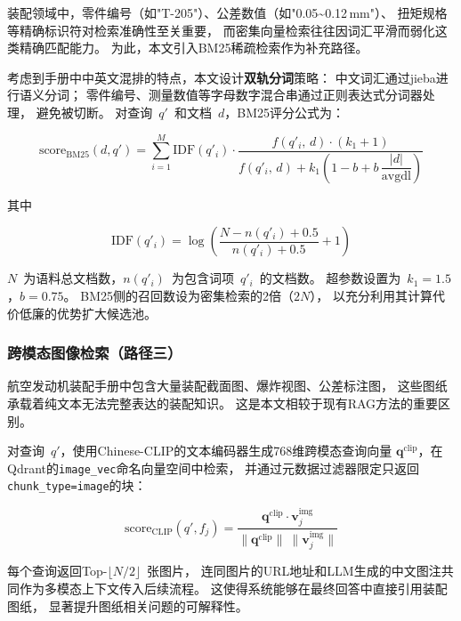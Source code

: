 装配领域中，零件编号（如"T-205"）、公差数值（如"0.05\textasciitilde0.12\,mm"）、
扭矩规格等精确标识符对检索准确性至关重要，
而密集向量检索往往因词汇平滑而弱化这类精确匹配能力。
为此，本文引入BM25稀疏检索作为补充路径。

考虑到手册中中英文混排的特点，本文设计\textbf{双轨分词}策略：
中文词汇通过jieba进行语义分词；
零件编号、测量数值等字母数字混合串通过正则表达式分词器处理，
避免被切断。
对查询~$q'$~和文档~$d$，BM25评分公式为：

\begin{equation}
  \text{score}_{\text{BM25}}(d, q')
  = \sum_{i=1}^{M} \text{IDF}(q'_i)
    \cdot \frac{f(q'_i,\, d) \cdot (k_1 + 1)}
               {f(q'_i,\, d)
                + k_1\!\left(1 - b + b\,\dfrac{|d|}{\text{avgdl}}\right)}
  \label{eq:bm25}
\end{equation}

其中

\begin{equation}
  \text{IDF}(q'_i)
  = \log\!\left(\frac{N - n(q'_i) + 0.5}{n(q'_i) + 0.5} + 1\right)
  \label{eq:idf}
\end{equation}

$N$~为语料总文档数，$n(q'_i)$~为包含词项~$q'_i$~的文档数。
超参数设置为~$k_1 = 1.5$，$b = 0.75$。
BM25侧的召回数设为密集检索的2倍（$2N$），
以充分利用其计算代价低廉的优势扩大候选池。

\subsubsection{跨模态图像检索（路径三）}
\label{sec:clip}

航空发动机装配手册中包含大量装配截面图、爆炸视图、公差标注图，
这些图纸承载着纯文本无法完整表达的装配知识。
这是本文相较于现有RAG方法的重要区别。

对查询~$q'$，使用Chinese-CLIP的文本编码器生成768维跨模态查询向量
$\mathbf{q}^{\text{clip}}$，在Qdrant的\texttt{image\_vec}命名向量空间中检索，
并通过元数据过滤器限定只返回\texttt{chunk\_type=image}的块：

\begin{equation}
  \text{score}_{\text{CLIP}}(q', f_j)
  = \frac{\mathbf{q}^{\text{clip}} \cdot \mathbf{v}_j^{\text{img}}}
         {\|\mathbf{q}^{\text{clip}}\|\ \|\mathbf{v}_j^{\text{img}}\|}
  \label{eq:clip-score}
\end{equation}

每个查询返回Top-$\lfloor N/2 \rfloor$~张图片，
连同图片的URL地址和LLM生成的中文图注共同作为多模态上下文传入后续流程。
这使得系统能够在最终回答中直接引用装配图纸，
显著提升图纸相关问题的可解释性。

